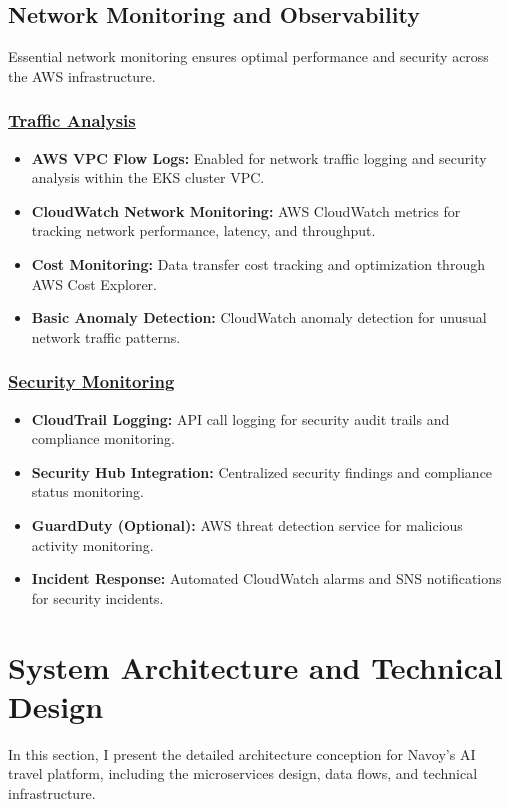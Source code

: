 \subsection{Network Monitoring and Observability}
Essential network monitoring ensures optimal performance and security across the AWS infrastructure.

\subsubsection*{\underline{Traffic Analysis}}
\begin{itemize}
    \item \textbf{AWS VPC Flow Logs:} Enabled for network traffic logging and security analysis within the EKS cluster VPC.
    \item \textbf{CloudWatch Network Monitoring:} AWS CloudWatch metrics for tracking network performance, latency, and throughput.
    \item \textbf{Cost Monitoring:} Data transfer cost tracking and optimization through AWS Cost Explorer.
    \item \textbf{Basic Anomaly Detection:} CloudWatch anomaly detection for unusual network traffic patterns.
\end{itemize}

\subsubsection*{\underline{Security Monitoring}}
\begin{itemize}
    \item \textbf{CloudTrail Logging:} API call logging for security audit trails and compliance monitoring.
    \item \textbf{Security Hub Integration:} Centralized security findings and compliance status monitoring.
    \item \textbf{GuardDuty (Optional):} AWS threat detection service for malicious activity monitoring.
    \item \textbf{Incident Response:} Automated CloudWatch alarms and SNS notifications for security incidents.
\end{itemize}

\section{System Architecture and Technical Design}
In this section, I present the detailed architecture conception for Navoy's AI travel platform, including the microservices design, data flows, and technical infrastructure.

